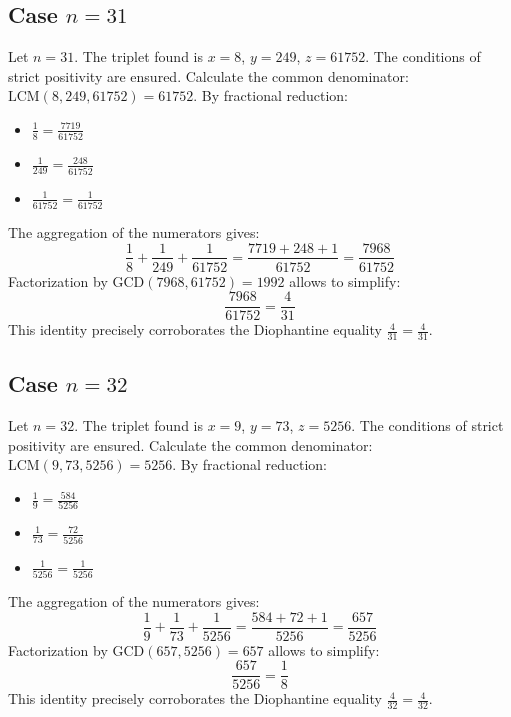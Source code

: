 \documentclass[11pt,a4paper]{article}
\begin{document}
\subsection{Case $n = 31$}
Let $n = 31$. The triplet found is $x = 8$, $y = 249$, $z = 61752$.
The conditions of strict positivity are ensured.
Calculate the common denominator: $\text{LCM}(8, 249, 61752) = 61752$.
By fractional reduction:
\begin{itemize}
    \item $\frac{1}{8} = \frac{7719}{61752}$
    \item $\frac{1}{249} = \frac{248}{61752}$
    \item $\frac{1}{61752} = \frac{1}{61752}$
\end{itemize}
The aggregation of the numerators gives:
$$ \frac{1}{8} + \frac{1}{249} + \frac{1}{61752} = \frac{7719 + 248 + 1}{61752} = \frac{7968}{61752} $$
Factorization by $\text{GCD}(7968, 61752) = 1992$ allows to simplify:
$$ \frac{7968}{61752} = \frac{4}{31} $$
This identity precisely corroborates the Diophantine equality $\frac{4}{31} = \frac{4}{31}$.

\subsection{Case $n = 32$}
Let $n = 32$. The triplet found is $x = 9$, $y = 73$, $z = 5256$.
The conditions of strict positivity are ensured.
Calculate the common denominator: $\text{LCM}(9, 73, 5256) = 5256$.
By fractional reduction:
\begin{itemize}
    \item $\frac{1}{9} = \frac{584}{5256}$
    \item $\frac{1}{73} = \frac{72}{5256}$
    \item $\frac{1}{5256} = \frac{1}{5256}$
\end{itemize}
The aggregation of the numerators gives:
$$ \frac{1}{9} + \frac{1}{73} + \frac{1}{5256} = \frac{584 + 72 + 1}{5256} = \frac{657}{5256} $$
Factorization by $\text{GCD}(657, 5256) = 657$ allows to simplify:
$$ \frac{657}{5256} = \frac{1}{8} $$
This identity precisely corroborates the Diophantine equality $\frac{4}{32} = \frac{4}{32}$.
\end{document}
